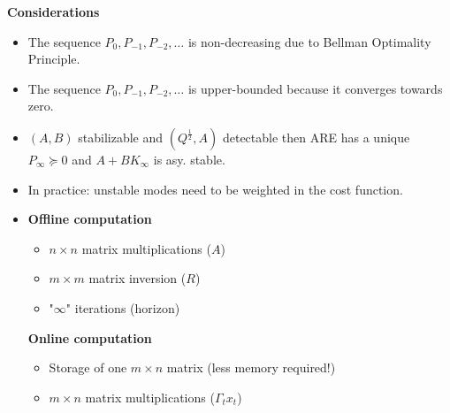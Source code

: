 \textbf{Considerations}
\begin{itemize}
    \item The sequence \( P_0, P_{-1}, P_{-2}, \ldots \) is non-decreasing due to Bellman Optimality Principle.
    \item The sequence \( P_0, P_{-1}, P_{-2}, \ldots \) is upper-bounded because it converges towards zero.
    \item $(A,B)$ stabilizable and $(Q^{\frac{1}{2}},A)$ detectable then ARE has a unique $P_{\infty} \succeq 0$ and $A+BK_\infty$ is asy. stable.
    \item In practice: unstable modes need to be weighted in the cost function. 
    \item \begin{minipage}[t]{0.45\textwidth}
            \textbf{Offline computation}
            \begin{itemize}
                \item $n \times n$ matrix multiplications ($A$)
                \item $m \times m$ matrix inversion ($R$)
                \item "$\infty$" iterations (horizon)
            \end{itemize}
         \end{minipage}\hfill
         \begin{minipage}[t]{0.45\textwidth}
            \textbf{Online computation}
            \begin{itemize}
                \item Storage of one $m \times n$ matrix (less memory required!)
                \item $m \times n$ matrix multiplications ($\Gamma_t x_t$)
            \end{itemize}
        \end{minipage}
\end{itemize}
